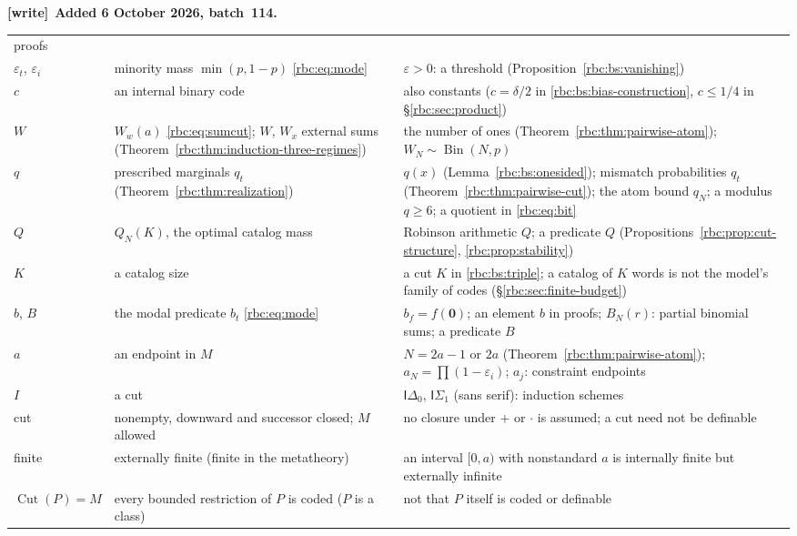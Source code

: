 \documentclass[11pt]{article}
\numberwithin{equation}{section}
\theoremstyle{definition}
\theoremstyle{remark}
\newcommand{\Cut}{\operatorname{Cut}}
\newenvironment{writenote}[1][]{\par\smallskip\begingroup\small
 \noindent\textbf{[write]}\if\relax\detokenize{#1}\relax\else~\textbf{#1.}\fi\ }%
 {\par\endgroup\smallskip}
\begin{document}
\begin{writenote}[Added 6 October 2026, batch~114]
\begin{center}
\begin{tabular}{>{\raggedright}p{}>{\raggedright}p{}>{\raggedright\arraybackslash}p{}}
 proofs\\
$\varepsilon_t$, $\varepsilon_i$ & minority mass $\min(p,1-p)$
 \eqref{rbc:eq:mode} & $\varepsilon>0$: a threshold
 (Proposition~\ref{rbc:bs:vanishing})\\
$c$ & an internal binary code & also constants ($c=\delta/2$ in
 \eqref{rbc:bs:bias-construction}, $c\le1/4$ in \S\ref{rbc:sec:product})\\
$W$ & $W_w(a)$ \eqref{rbc:eq:sumcut}; $W$, $W_x$ external sums
 (Theorem~\ref{rbc:thm:induction-three-regimes}) & the number of ones
 (Theorem~\ref{rbc:thm:pairwise-atom}); $W_N\sim\operatorname{Bin}(N,p)$\\
$q$ & prescribed marginals $q_t$ (Theorem~\ref{rbc:thm:realization}) &
 $q(x)$ (Lemma~\ref{rbc:bs:onesided}); mismatch probabilities $q_t$
 (Theorem~\ref{rbc:thm:pairwise-cut}); the atom bound $q_N$; a modulus
 $q\ge6$; a quotient in \eqref{rbc:eq:bit}\\
$Q$ & $Q_N(K)$, the optimal catalog mass & Robinson arithmetic $Q$; a
 predicate $Q$ (Propositions~\ref{rbc:prop:cut-structure},
 \ref{rbc:prop:stability})\\
$K$ & a catalog size & a cut $K$ in \eqref{rbc:bs:triple}; a catalog of $K$
 words is not the model's family of codes (\S\ref{rbc:sec:finite-budget})\\
$b$, $B$ & the modal predicate $b_t$ \eqref{rbc:eq:mode} & $b_f=f(\mathbf
 0)$; an element $b$ in proofs; $B_N(r)$: partial binomial sums; a
 predicate $B$\\
$a$ & an endpoint in $M$ & $N=2a-1$ or $2a$ (Theorem~\ref{rbc:thm:pairwise-atom});
 $a_N=\prod(1-\varepsilon_i)$; $a_j$: constraint endpoints\\
$I$ & a cut & $\mathsf I\Delta_0$, $\mathsf I\Sigma_1$ (sans serif):
 induction schemes\\
cut & nonempty, downward and successor closed; $M$ allowed & no closure
 under $+$ or $\cdot$ is assumed; a cut need not be definable\\
finite & externally finite (finite in the metatheory) & an interval
 $[0,a)$ with nonstandard $a$ is internally finite but externally
 infinite\\
$\Cut(P)=M$ & every bounded restriction of $P$ is coded ($P$ is a class) &
 not that $P$ itself is coded or definable\\
\bottomrule
\end{tabular}
\end{center}
\endgroup


\end{writenote}
\end{document}
